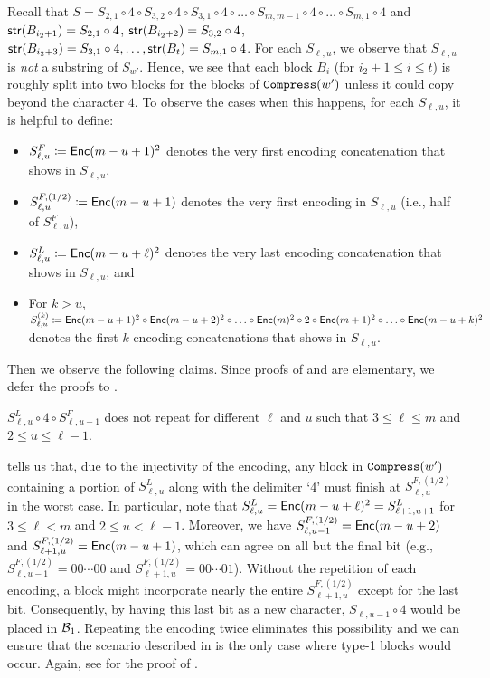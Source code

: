 \begin{proofof}{}
Recall that $S=S_{2,1}\circ4\circ S_{3,2}\circ4\circ S_{3,1}\circ4\circ\ldots\circ S_{m,m-1}\circ4\circ\ldots\circ S_{m,1}\circ4$ and $\mathsf{str}(B_{i_2+1})=S_{2,1}\circ4$, $\mathsf{str}(B_{i_2+2})=S_{3,2}\circ4$, $\mathsf{str}(B_{i_2+3})=S_{3,1}\circ4,\ldots,\mathsf{str}(B_t)=S_{m,1}\circ4$. 
For each $S_{\ell,u}$, we observe that $S_{\ell,u}$ is \emph{not} a substring of $S_{w'}$. Hence, we see that each block $B_i$ (for $i_2+1\leq i\leq t$) is roughly split into two blocks for the blocks of $\mathtt{Compress}(w')$ unless it could copy beyond the character $4$. To observe the cases when this happens,
for each $S_{\ell,u}$, it is helpful to define:
\begin{itemize}
    \item $S_{\ell,u}^F\coloneqq\mathsf{Enc}(m-u+1)^2$ denotes the very first encoding concatenation that shows in $S_{\ell,u}$, 
    \item $S_{\ell,u}^{F,(1/2)}\coloneqq\mathsf{Enc}(m-u+1)$ denotes the very first encoding in $S_{\ell,u}$ (i.e., half of $S_{\ell,u}^F$),
    \item $S_{\ell,u}^L\coloneqq\mathsf{Enc}(m-u+\ell)^2$ denotes the very last encoding concatenation that shows in $S_{\ell,u}$, and
    \item For $k>u$, $S_{\ell,u}^{(k)}\coloneqq\mathsf{Enc}(m-u+1)^2\circ\mathsf{Enc}(m-u+2)^2\circ\ldots\circ\mathsf{Enc}(m)^2\circ2\circ\mathsf{Enc}(m+1)^2\circ\ldots\circ\mathsf{Enc}(m-u+k)^2$ denotes the first $k$ encoding concatenations that shows in $S_{\ell,u}$.
\end{itemize}
Then we observe the following claims. Since proofs of  and  are elementary, we defer the proofs to .

\begin{claim}
$S_{\ell,u}^L\circ4\circ S_{\ell,u-1}^F$ does not repeat for different $\ell$ and $u$ such that $3\leq\ell\leq m$ and $2\leq u\leq\ell-1$.
\end{claim}

 tells us that, due to the injectivity of the encoding, any block in $\mathtt{Compress}(w')$ containing a portion of $S_{\ell,u}^L$ along with the delimiter `4' must finish at $S_{\ell,u}^{F,(1/2)}$ in the worst case. In particular, note that $S_{\ell,u}^L=\mathsf{Enc}(m-u+\ell)^2=S_{\ell+1,u+1}^L$ for $3\leq \ell<m$ and $2\leq u<\ell-1$. Moreover, we have $S_{\ell,u-1}^{F,(1/2)}=\mathsf{Enc}(m-u+2)$ and $S_{\ell+1,u}^{F,(1/2)}=\mathsf{Enc}(m-u+1)$, which can agree on all but the final bit (e.g., $S_{\ell,u-1}^{F,(1/2)}=00\cdots00$ and $S_{\ell+1,u}^{F,(1/2)}=00\cdots01$). Without the repetition of each encoding, a block might incorporate nearly the entire $S_{\ell+1,u}^{F,(1/2)}$ except for the last bit. Consequently, by having this last bit as a new character, $S_{\ell,u-1}\circ4$ would be placed in ${\mathcal{B}}_1$. Repeating the encoding twice eliminates this possibility and we can ensure that the scenario described in  is the only case where type-1 blocks would occur. Again, see  for the proof of .



\end{proofof}
